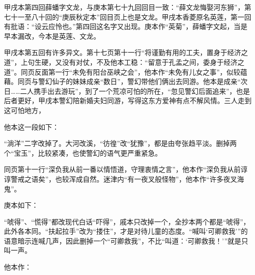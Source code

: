 \par 甲戌本第四回薛蟠字文龙，与庚本第七十九回回目一致：“薛文龙悔娶河东狮”，第七十一至八十回的“庚辰秋定本”回目页上也是文龙。甲戌本香菱原名英莲，第一回有批语：“设云应怜也。”第四回这名字又出现。庚本作“英菊”，薛蟠字文起，当是早本漏改，今本是英莲、文龙。
\par 甲戌本第五回有许多异文。第十七页第十一行“将谨勤有用的工夫，置身于经济之道”，上句生硬，又没有对仗，不及他本工稳：“留意于孔孟之间，委身于经济之道”。同页反面第一行“未免有阳台巫峡之会”，他本作“未免有儿女之事”，似较蕴藉。同页与警幻仙子的妹妹成亲“数日”，警幻带他们俩出去同游。他本是成亲“次日……二人携手出去游玩”，到了一个荒凉可怕的所在，“忽见警幻后面追来”，也是后者更好，甲戌本警幻陪新婚夫妇同游，写得这东方爱神有点不解风情。三人走到这可怕地方，
\par 他本这一段如下：
\par “淌洋”二字改掉了。大河改溪，“彷徨”改“犹豫”，都是由夸张趋平淡。删掉两个“宝玉”，比较紧凑，也使警幻的语气更严重紧急。
\par 同页第十一行“深负我从前一番以情悟道，守理衷情之言”，他本作“深负我从前谆谆警戒之语矣”，也较浑成自然。迷津内“有一夜叉般怪物”，他本作“许多夜叉海鬼”。
\par 庚本如下：
\par “唬得”、“慌得”都改现代白话“吓得”，戚本只改掉一个，全抄本两个都是“唬得”，此外各本同。“扶起拉手”改为“搂住”，才是对待儿童的态度。“喊叫‘可卿救我’”的语意暗示连喊几声，因此删掉一个“可卿救我”，不比“叫道：‘可卿救我！'”就是只叫一声。
\par 他本作：
